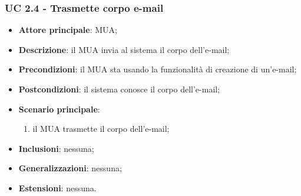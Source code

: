     \subsubsection{UC 2.4 - Trasmette corpo e-mail} \label{sec:UC2.4}
    \begin{itemize}
        \item \textbf{Attore principale}: MUA;
        \item \textbf{Descrizione}: il MUA invia al sistema il corpo dell'e-mail;
        \item \textbf{Precondizioni}: il MUA sta usando la funzionalità di creazione di un'e-mail;
        \item \textbf{Postcondizioni}: il sistema conosce il corpo dell'e-mail;
        \item \textbf{Scenario principale}:
            \begin{enumerate}
                \item il MUA trasmette il corpo dell'e-mail;
            \end{enumerate}
        \item \textbf{Inclusioni}: nessuna;
        \item \textbf{Generalizzazioni}: nessuna;
        \item \textbf{Estensioni}: nessuna.
    \end{itemize}

